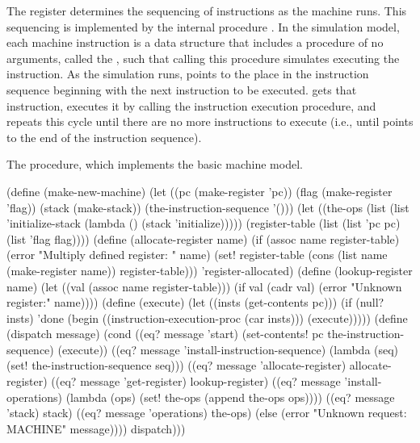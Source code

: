 The  register determines the sequencing of instructions as the machine
runs.  This sequencing is implemented by the internal procedure .
In the simulation model, each machine instruction is a data structure that
includes a procedure of no arguments, called the , such that calling this procedure simulates executing the
instruction.  As the simulation runs,  points to the place in the
instruction sequence beginning with the next instruction to be executed.
 gets that instruction, executes it by calling the instruction
execution procedure, and repeats this cycle until there are no more
instructions to execute (i.e., until  points to the end of the
instruction sequence).

\begin{codeFigure}
  {%
    The  procedure, which implements the basic
    machine model.
  }%
\begin{codeBlock}
(define (make-new-machine)
  (let ((pc (make-register 'pc))
        (flag (make-register 'flag))
        (stack (make-stack))
        (the-instruction-sequence '()))
    (let ((the-ops
            (list
              (list 'initialize-stack
                    (lambda ()
                      (stack 'initialize)))))
          (register-table
            (list (list 'pc pc)
                  (list 'flag flag))))
      (define (allocate-register name)
        (if (assoc name register-table)
            (error
              "Multiply defined register: "
              name)
            (set! register-table
                  (cons (list name
                              (make-register name))
                        register-table)))
        'register-allocated)
      (define (lookup-register name)
        (let ((val (assoc name register-table)))
          (if val
              (cadr val)
              (error
                "Unknown register:"
                name))))
      (define (execute)
        (let ((insts (get-contents pc)))
          (if (null? insts)
              'done
              (begin
                ((instruction-execution-proc
                   (car insts)))
                (execute)))))
      (define (dispatch message)
        (cond ((eq? message 'start)
               (set-contents!
                 pc
                 the-instruction-sequence)
               (execute))
              ((eq? message
                    'install-instruction-sequence)
               (lambda (seq)
                 (set! the-instruction-sequence seq)))
              ((eq? message 'allocate-register)
               allocate-register)
              ((eq? message 'get-register)
               lookup-register)
              ((eq? message 'install-operations)
               (lambda (ops)
                 (set! the-ops (append the-ops ops))))
              ((eq? message 'stack) stack)
              ((eq? message 'operations) the-ops)
              (else
                (error
                  "Unknown request: MACHINE"
                  message))))
      dispatch)))
\end{codeBlock}
\end{codeFigure}

